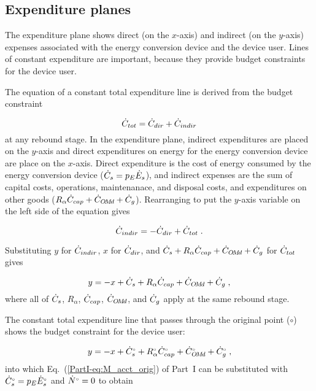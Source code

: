 \subsection{Expenditure planes}
\label{sec:expenditure_path_graph_details}

The expenditure plane shows direct (on the $x$-axis) and indirect (on the $y$-axis)
expenses associated with the energy conversion device 
and the device user.
Lines of constant expenditure are important, 
because they provide budget constraints for the device user.

The equation of a constant total expenditure line is derived from 
the budget constraint

\begin{equation}
  \dot{C}_{tot} = \dot{C}_{dir} + \dot{C}_{indir}
\end{equation}
%
at any rebound stage.
In the expenditure plane,
indirect expenditures are placed on the $y$-axis
and direct expenditures on energy for the energy conversion device are place on the $x$-axis.
Direct expenditure is the cost of energy consumed by the energy conversion device
($\dot{C}_s = p_E \dot{E}_s$), and 
indirect expenses are the sum of capital costs,
operations, maintenanace, and disposal costs, and 
expenditures on other goods
($R_\alpha \dot{C}_{cap} + \dot{C}_{O\!M\!d} + \dot{C}_g$).
Rearranging to put the $y$-axis variable on the left side of the equation gives

\begin{equation}
  \dot{C}_{indir} = - \dot{C}_{dir} + \dot{C}_{tot} \; .
\end{equation}

Substituting $y$ for $\dot{C}_{indir}$, 
$x$ for $\dot{C}_{dir}$, and 
$\dot{C}_s + R_\alpha \dot{C}_{cap} + \dot{C}_{O\!M\!d} + \dot{C}_g$ for $\dot{C}_{tot}$
gives

\begin{equation}
  y = -x + \dot{C}_s + R_\alpha \dot{C}_{cap} + \dot{C}_{O\!M\!d} + \dot{C}_g \; ,
\end{equation}
%
where all of $\dot{C}_s$, $R_\alpha$, $\dot{C}_{cap}$, $\dot{C}_{O\!M\!d}$, and $\dot{C}_g$
apply at the same rebound stage.

The constant total expenditure line 
that passes through the original point ($\circ$)
shows the budget constraint for the device user:

\begin{equation}
  y = -x + {}{\dot{C}}^{\scriptscriptstyle \circ}_s + {}{R}^{\scriptscriptstyle \circ}_\alpha {}{\dot{C}}^{\scriptscriptstyle \circ}_{cap} + {}{\dot{C}}^{\scriptscriptstyle \circ}_{O\!M\!d} + {}{\dot{C}}^{\scriptscriptstyle \circ}_g \; ,
\end{equation}
%
into which Eq.~(\ref{PartI-eq:M_acct_orig}) of Part~I can be substituted with 
${}{\dot{C}}^{\scriptscriptstyle \circ}_s = p_E {}{\dot{E}}^{\scriptscriptstyle \circ}_s$ and 
${}{\dot{N}}^{\scriptscriptstyle \circ} = 0$ to obtain

